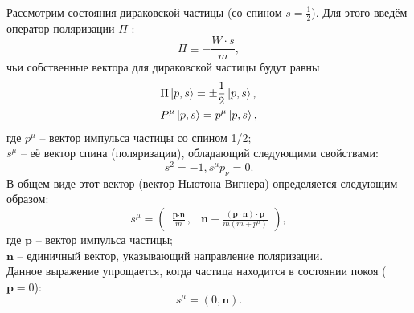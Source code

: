 \documentclass{extarticle}
\begin{document}
Рассмотрим состояния дираковской частицы (со спином $s=\frac{1}{2}$). Для этого введём оператор поляризации $\Pi$ \cite{Barone_2002}:
\begin{equation}
	\Pi \equiv - \frac{W \cdot s}{m},
\end{equation}
чьи собственные вектора для дираковской частицы будут равны
\begin{equation}
	\begin{split}
		& \Pi \ket{p, s} = \pm \frac{1}{2} \ket{p, s}, \\
		& P^\mu \ket{p, s} = p^\mu \ket{p, s},
	\end{split}
\end{equation}
где $p^\mu$ -- вектор импульса частицы со спином 1/2; \\ $s^\mu$ -- её вектор спина (поляризации), обладающий следующими свойствами:
\begin{equation}
	s^2 = -1, s^\mu p_\nu = 0.
\end{equation}
В общем виде этот вектор (вектор Ньютона-Вигнера) определяется следующим образом:
\begin{equation}
	s^\mu = \begin{pmatrix}
		\frac{\textbf{p}\cdot \textbf{n}}{m}, & \textbf{n} + \frac{(\textbf{p}\cdot \textbf{n}) \cdot \textbf{p}}{m(m+p^0)}
	\end{pmatrix},
\end{equation}
где $\textbf{p}$ -- вектор импульса частицы; \\ $\textbf{n}$ -- единичный вектор, указывающий направление поляризации. \\ Данное выражение упрощается, когда частица находится в состоянии покоя ($\textbf{p} = 0$):
\begin{equation}
	s^\mu = (0, \textbf{n}).
\end{equation}
\end{document}
